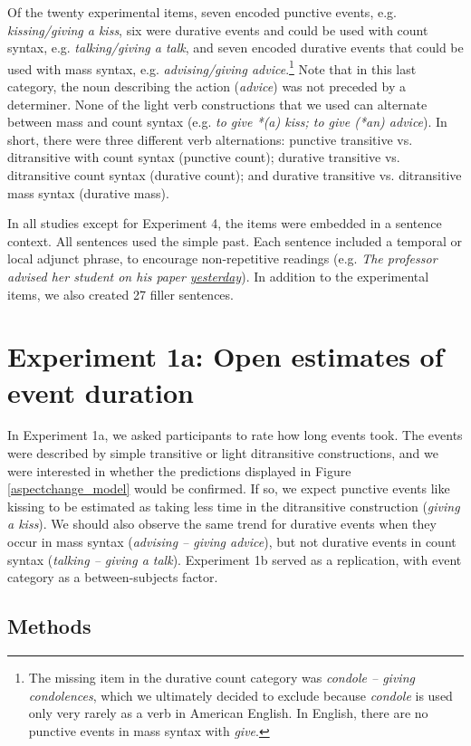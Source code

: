 \documentclass[preprint,12pt,authoryear]{elsarticle}
\begin{document}
Of the twenty experimental items, seven encoded punctive events, e.g. \emph{kissing/giving a kiss}, six were durative events and could be used with count syntax, e.g. \emph{talking/giving a talk}, and seven encoded durative events that could be used with mass syntax, e.g. \emph{advising/giving advice}.\footnote{The missing item in the durative count category was \emph{condole -- giving condolences}, which we ultimately decided to exclude because \emph{condole} is used only very rarely as a verb in American English. In English, there are no punctive events in mass syntax with \emph{give}.} Note that in this last category, the noun describing the action (\emph{advice}) was not preceded by a determiner. None of the light verb constructions that we used can alternate between mass and count syntax (e.g. \emph{to give *(a) kiss; to give (*an) advice}). In short, there were three different verb alternations: punctive transitive vs. ditransitive with count syntax (punctive count); durative transitive vs. ditransitive count syntax (durative count); and durative transitive vs. ditransitive mass syntax (durative mass).

In all studies except for Experiment 4, the items were embedded in a sentence context. All sentences used the simple past. Each sentence included a temporal or local adjunct phrase, to encourage non-repeti\-tive readings (e.g. \emph{The professor advised her student on his paper \underline{yesterday}}). In addition to the experimental items, we also created 27 filler sentences.

\section{Experiment 1a: Open estimates of event duration} \label{sec_expOE}
In Experiment 1a, we asked participants to rate how long events took. The events were described by simple transitive or light ditransitive constructions, and we were interested in whether the predictions displayed in Figure \ref{aspectchange_model} would be confirmed. If so, we expect punctive events like {kissing} to be estimated as taking less time in the ditransitive construction (\emph{giving a kiss}). We should also observe the same trend for durative events when they occur in mass syntax (\emph{advising -- giving advice}), but not durative events in count syntax (\emph{talking -- giving a talk}). Experiment 1b served as a replication, with event category as a between-subjects factor.

\subsection{Methods}
\end{document}
